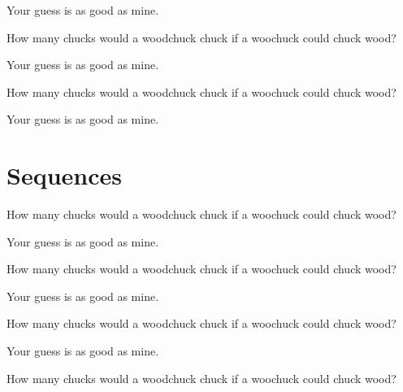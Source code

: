 \documentclass[12pt]{article}
\newenvironment{question}[2][Q]{\begin{trivlist}
\item[\hskip \labelsep {\bfseries #1}\hskip \labelsep {\bfseries #2.}]}{\end{trivlist}}
\newenvironment{answer}[2][A]{\begin{trivlist}
\item[\hskip \labelsep {\bfseries #1}\hskip \labelsep {\bfseries #2.}]}{\end{trivlist}}
\begin{document}
\begin{answer}{8}
Your guess is as good as mine.
\end{answer}

\begin{question}{9}
  How many chucks would a woodchuck chuck if a woochuck could chuck wood?
\end{question}

\begin{answer}{9}
Your guess is as good as mine.
\end{answer}

\begin{question}{10}
  How many chucks would a woodchuck chuck if a woochuck could chuck wood?
\end{question}

\begin{answer}{10}
Your guess is as good as mine.
\end{answer}

\section{Sequences}

\begin{question}{11}
  How many chucks would a woodchuck chuck if a woochuck could chuck wood?
\end{question}

\begin{answer}{11}
Your guess is as good as mine.
\end{answer}
\begin{question}{12}
  How many chucks would a woodchuck chuck if a woochuck could chuck wood?
\end{question}

\begin{answer}{12}
Your guess is as good as mine.
\end{answer}

\begin{question}{13}
  How many chucks would a woodchuck chuck if a woochuck could chuck wood?
\end{question}

\begin{answer}{13}
Your guess is as good as mine.
\end{answer}
\begin{question}{14}
  How many chucks would a woodchuck chuck if a woochuck could chuck wood?
\end{question}
\end{document}
